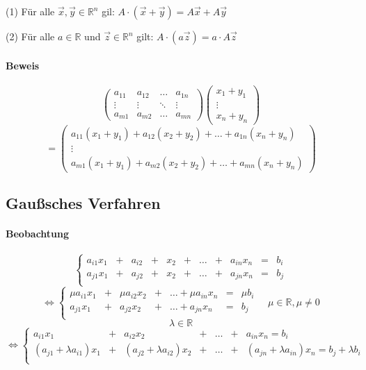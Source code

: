 \documentclass[a4paper,12pt]{article}
\begin{document}
(1) Für alle $\vec{x},\vec{y}\in\mathbb{R}^n$ gil: $A\cdot(\vec{x}+\vec{y})=A\vec{x}+A\vec{y}$

(2) Für alle $a\in\mathbb{R}$ und $\vec{z}\in\mathbb{R}^n$ gilt: $A\cdot (a\vec{z})=a\cdot A\vec{z}$

\paragraph*{Beweis}

$$\begin{pmatrix}
    a_{11} & a_{12} & \dots  & a_{1n} \\
    \vdots & \vdots & \ddots & \vdots \\
    a_{m1} & a_{m2} & \dots  & a_{mn}
  \end{pmatrix}\begin{pmatrix}
    x_{1} + y_{1} \\ \vdots \\ x_{n} +y_{n}
  \end{pmatrix}$$
$$=\begin{pmatrix}
    a_{11}(x_{1}+y_{1}) + a_{12}(x_{2}+y_{2}) + \dots  + a_{1n}(x_{n}+y_{n}) \\
    \vdots                                                                   \\
    a_{m1}(x_{1}+y_{1}) + a_{m2}(x_{2}+y_{2}) + \dots  + a_{mn}(x_{n}+y_{n})
  \end{pmatrix}$$

\subsection*{Gaußsches Verfahren}

\paragraph{Beobachtung}

$$\left\{\begin{aligned}
    a_{i1}x_{1} & + & a_{i2} & + & x_{2} & + & \dots & + & a_{in}x_{n} & = & b_i \\
    a_{j1}x_{1} & + & a_{j2} & + & x_{2} & + & \dots & + & a_{jn}x_{n} & = & b_j \\
  \end{aligned} \right.$$
$$\iff\left\{\begin{aligned}
    \mu a_{i1}x_{1} & + & \mu a_{i2}x_{2} & + & \dots+\mu a_{in}x_{n} & = & \mu b_i \\
    a_{j1}x_{1}     & + & a_{j2}x_{2}     & + & \dots+a_{jn}x_{n}     & = & b_j     \\
  \end{aligned}\right.\quad\mu\in\mathbb{R},\mu\neq0$$
$$\lambda\in\mathbb{R}$$
$$\iff\left\{\begin{aligned}
    a_{i1}x_{1}                & + & a_{i2}x_{2}                  & + & \dots & + & a_{in}x_{n}=b_i                                \\
    (a_{j1}+\lambda a_{i1})x_1 & + & (a_{j2}+\lambda a_{i2})x_{2} & + & \dots & + & (a_{jn}+\lambda a_{in})x_{n}=b_j + \lambda b_i \\
  \end{aligned}\right.$$
\end{document}

